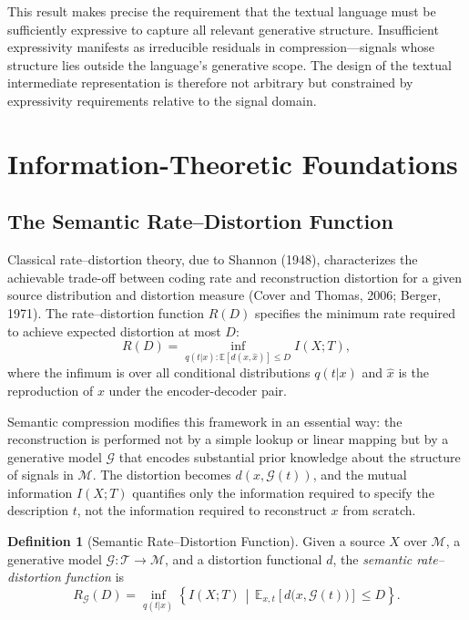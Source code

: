 \documentclass[11pt,a4paper]{article}
\theoremstyle{definition}
\newtheorem{definition}[theorem]{Definition}
\theoremstyle{remark}
\begin{document}
This result makes precise the requirement that the textual language must be sufficiently expressive to capture all relevant generative structure. Insufficient expressivity manifests as irreducible residuals in compression---signals whose structure lies outside the language's generative scope. The design of the textual intermediate representation is therefore not arbitrary but constrained by expressivity requirements relative to the signal domain.

\section{Information-Theoretic Foundations}
\label{sec:infotheory}

\subsection{The Semantic Rate--Distortion Function}

Classical rate--distortion theory, due to Shannon (1948), characterizes the achievable trade-off between coding rate and reconstruction distortion for a given source distribution and distortion measure (Cover and Thomas, 2006; Berger, 1971). The rate--distortion function $R(D)$ specifies the minimum rate required to achieve expected distortion at most $D$:
\[
R(D) = \inf_{q(t|x) : \mathbb{E}[d(x,\hat{x})] \le D} I(X; T),
\]
where the infimum is over all conditional distributions $q(t|x)$ and $\hat{x}$ is the reproduction of $x$ under the encoder-decoder pair.

Semantic compression modifies this framework in an essential way: the reconstruction is performed not by a simple lookup or linear mapping but by a generative model $\mathcal{G}$ that encodes substantial prior knowledge about the structure of signals in $\mathcal{M}$. The distortion becomes $d(x, \mathcal{G}(t))$, and the mutual information $I(X; T)$ quantifies only the information required to specify the description $t$, not the information required to reconstruct $x$ from scratch.

\begin{definition}[Semantic Rate--Distortion Function]
Given a source $X$ over $\mathcal{M}$, a generative model $\mathcal{G} : \mathcal{T} \rightarrow \mathcal{M}$, and a distortion functional $d$, the \emph{semantic rate--distortion function} is
\[
R_{\mathcal{G}}(D) = \inf_{q(t|x)} \left\{ I(X; T) \,\middle|\, \mathbb{E}_{x, t}\left[d\big(x, \mathcal{G}(t)\big)\right] \le D \right\}.
\]
\end{definition}
\end{document}
